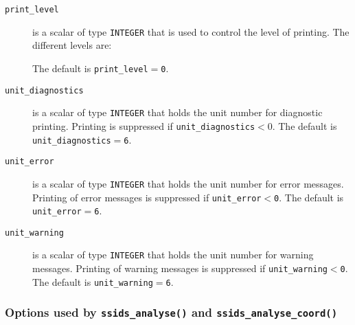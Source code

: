 \begin{description}

\item[\texttt{print\_level}] is a scalar of type  {\tt INTEGER}
that is used to control the level of printing. The different levels are:
The default is {\tt print\_level$=$\tt 0}.

\item[\texttt{unit\_diagnostics}] is a scalar  of type
{\tt INTEGER} that holds the
unit number for diagnostic printing. Printing is suppressed if
{\tt unit\_diagnostics$<0$}.
The default is {\tt unit\_diagnostics$=$6}.

\item[\texttt{unit\_error}] is a scalar of type  {\tt INTEGER} that holds the
unit number for error messages.
Printing of error messages
is suppressed if {\tt unit\_error$<$0}.
The default is {\tt unit\_error$=$6}.

\item[\texttt{unit\_warning}] is a scalar  of type  {\tt INTEGER} that holds the
unit number for warning messages.
Printing of warning messages is suppressed if {\tt unit\_warning$<$0}.
The default is {\tt unit\_warning$=$6}.

\end{description}



\subsubsection*{Options used by {\tt ssids\_analyse()} and
{\tt ssids\_analyse\_coord()}}

